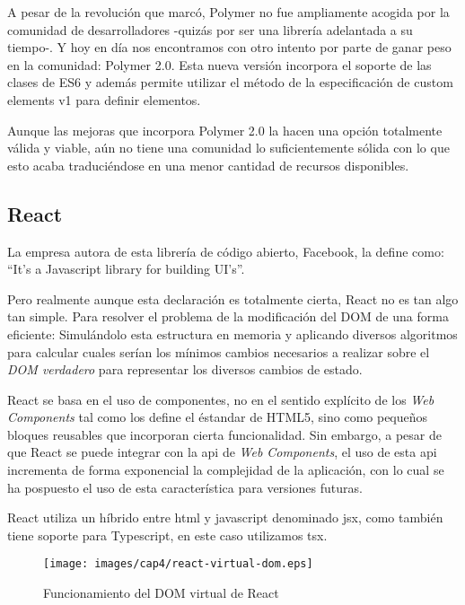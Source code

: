 \bigskip
A pesar de la revolución que marcó, Polymer no fue ampliamente acogida por la comunidad de desarrolladores 
-quizás por ser una librería adelantada a su tiempo-. Y hoy en día nos encontramos con otro intento por 
parte de ganar peso en la comunidad: Polymer 2.0. Esta nueva versión incorpora el soporte de las clases de ES6
y además permite utilizar el método de la especificación de custom elements v1 para definir elementos.

\bigskip
Aunque las mejoras que incorpora Polymer 2.0 la hacen una opción totalmente válida y viable, aún no 
tiene una comunidad lo suficientemente sólida con lo que esto acaba traduciéndose en una menor 
cantidad de recursos disponibles.

\subsection{React}
La empresa autora de esta librería de código abierto, Facebook, la define como: “It’s a Javascript library for building UI’s”. \cite{React}

\bigskip
Pero realmente aunque esta declaración es totalmente cierta, React no es tan algo tan simple. Para resolver el problema
 de la modificación del DOM de una forma eficiente: Simulándolo esta estructura en memoria y aplicando diversos
 algoritmos para calcular cuales serían los mínimos cambios necesarios a realizar sobre el \textit{DOM verdadero}
 para representar los diversos cambios de estado.

\bigskip
React se basa en el uso de componentes, no en el sentido explícito de los \textit{Web Components} tal como los define 
el éstandar de HTML5, sino como pequeños bloques reusables que incorporan cierta funcionalidad. Sin embargo, a pesar 
de que React se puede integrar con la api de \textit{Web Components}, el uso de esta api incrementa de forma exponencial
la complejidad de la aplicación, con lo cual se ha pospuesto el uso de esta característica para versiones futuras.


\bigskip
React utiliza un híbrido entre html y javascript denominado jsx, como también tiene soporte para 
Typescript, en este caso utilizamos tsx.

\begin{figure}[!th]
\begin{center}
\texttt{[image: images/cap4/react-virtual-dom.eps]}
\caption{Funcionamiento del DOM virtual de React \cite{ReactVirtualDOM}}
\label{fig:Funcionamiento del DOM virtual de React}
\end{center}
\end{figure}

